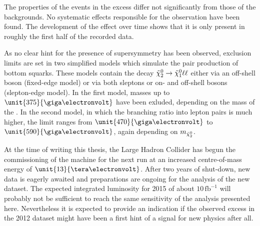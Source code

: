 The properties of the events in the excess differ not significantly from those of the backgrounds. No systematic effects responsible for the observation have been found. The development of the effect over time shows that it is only present in roughly the first half of the recorded data. 

As no clear hint for the presence of supersymmetry has been observed, exclusion limits are set in two simplified models which simulate the pair production of bottom squarks. These models contain the decay ${\tilde{\chi}^0_2} \rightarrow {\tilde{\chi}^0_1} \ell\ell$ either via an off-shell \Z boson (fixed-edge model) or via both sleptons or on- and off-shell \Z bosons (slepton-edge model). In the first model, \sbottom masses up to $\unit{375}{\giga\electronvolt}$ have been exluded, depending on the mass of the \secondchi. In the second model, in which the branching ratio into lepton pairs is much higher, the limit ranges from $\unit{470}{\giga\electronvolt}$ to $\unit{590}{\giga\electronvolt}$, again depending on $m_{{\tilde{\chi}^0_2}}$. 

At the time of writing this thesis, the Large Hadron Collider has begun the commissioning of the machine for the next run at  an increased centre-of-mass energy of $\unit{13}{\tera\electronvolt}$. After two years of shut-down, new data is eagerly awaited and preparations are ongoing for the analysis of the new dataset. The expected integrated luminosity for 2015 of about $10\,\mathrm{fb}^{-1}$ will probably not be sufficient to reach the same sensitivity of the analysis presented here. Nevertheless it is expected to provide an indication if the observed excess in the 2012 dataset might have been a first hint of a signal for new physics after all. 